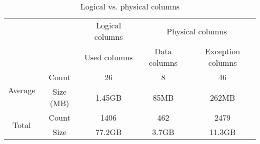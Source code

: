 \begin{table}[!h]
\centering
\begin{tabular}{cc|c|cc}
                         &           & Logical columns & \multicolumn{2}{c}{Physical columns} \\
                         &           & Used columns    & Data columns   & Exception columns   \\ \hline
\multirow{2}{*}{Average} & Count     & 26              & 8              & 46                  \\
                         & Size (MB) & 1.45GB          & 85MB           & 262MB               \\ \hline
\multirow{2}{*}{Total}   & Count     & 1406            & 462            & 2479                \\
                         & Size      & 77.2GB          & 3.7GB          & 11.3GB             
\end{tabular}
\caption{Logical vs. physical columns}
\label{tab:eval:results:analysis1}
\end{table}